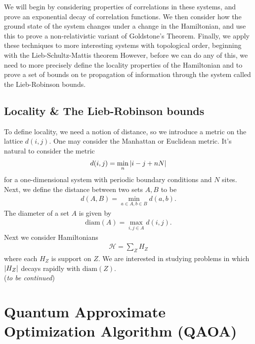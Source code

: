 \documentclass{book}
\theoremstyle{definition}
\newcommand{\had}{\mathcal{H}}
\begin{document}
We will begin by considering properties of correlations in these systems, and prove an exponential decay of correlation functions. We then consider how the ground state of the system changes under a change in the Hamiltonian, and use this to prove a non-relativistic variant of Goldstone's Theorem. Finally, we apply these techniques to more interesting systems with topological order, beginning with the Lieb-Schultz-Mattis theorem However, before we can do any of this, we need to more precisely define the locality properties of the Hamiltonian and to prove a set of bounds on te propagation of information through the system called the Lieb-Robinson bounds. 



\subsection{Locality \& The Lieb-Robinson bounds}


To define locality, we need a notion of distance, so we introduce a metric on the lattice $d(i,j)$. One may consider the Manhattan or Euclidean metric. It's natural to consider the metric 
\begin{align}
d(i,j) = \min_n \abs{i-j + nN}
\end{align}
for a one-dimensional system with periodic boundary conditions and $N$ sites. Next, we define the distance between two sets $A,B$ to be
\begin{align}
d(A,B) = \min_{a\in A, b\in B}d(a,b).
\end{align}
The diameter of a set $A$ is given by
\begin{align}
\text{diam}(A) = \max_{i,j\in A}d(i,j).
\end{align}
Next we consider Hamiltonians
\begin{align}
\had = \sum_Z H_Z
\end{align}
where each $H_Z$ is support on $Z$. We are interested in studying problems in which $\abs{H_Z}$ decays rapidly with $\text{diam}(Z)$. \\


(\textit{to be continued})





\newpage


\section{Quantum Approximate Optimization Algorithm (QAOA)}
\end{document}
